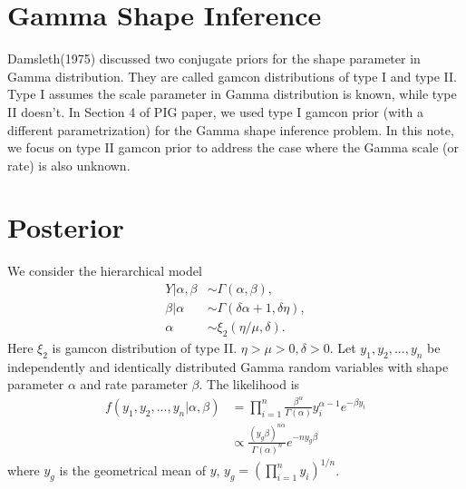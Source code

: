 \documentclass[11pt, oneside]{article}
\begin{document}
\section{Gamma Shape Inference}
Damsleth(1975) discussed two conjugate priors for the shape parameter in Gamma distribution. They are called gamcon distributions of type I and type II. Type I assumes the scale parameter in Gamma distribution is known, while type II doesn't. In Section 4 of PIG paper, we used type I gamcon prior (with a different parametrization) for the Gamma shape inference problem. In this note, we focus on type II gamcon prior to address the case where the Gamma scale (or rate) is also unknown.  

\section{Posterior}
We consider the hierarchical model
\begin{align*}
Y | \alpha, \beta &\sim \Gamma(\alpha, \beta),\\
\beta | \alpha &\sim \Gamma(\delta \alpha+1, \delta\eta),\\
\alpha &\sim \xi_2(\eta/\mu, \delta).
\end{align*} 
Here $\xi_2$ is gamcon distribution of type II. $\eta>\mu>0, \delta > 0$. Let $y_1, y_2, ..., y_n$ be independently and identically distributed Gamma random variables with shape parameter $\alpha$ and rate parameter $\beta$. The likelihood is 
\begin{align}
f(y_1, y_2, ..., y_n | \alpha, \beta) &= \prod_{i=1}^n \frac{\beta^\alpha}{\Gamma(\alpha)} y_i^{\alpha - 1} e^{-\beta y_i} \\
&\propto \frac{(y_g\beta)^{n\alpha}}{\Gamma(\alpha)^{n}} e^{-ny_g\beta}
\end{align}
where $y_g$ is the geometrical mean of $y$, $y_g = \left(\prod_{i=1}^{n} y_i\right)^{1/n}$.
\end{document}
